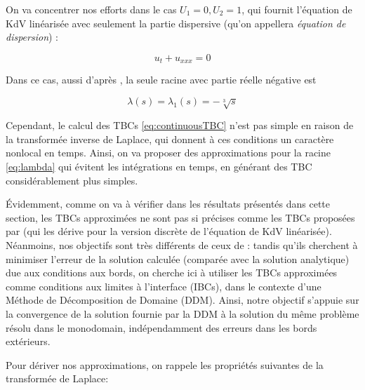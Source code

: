 \indent On va concentrer nos efforts dans le cas $U_1 = 0, U_2 = 1$, qui fournit l'équation de KdV linéarisée avec seulement la partie dispersive (qu'on appellera \emph{équation de dispersion}) :

\begin{equation}
	\label{eq:DKdV}
	u_t + u_{xxx} = 0
\end{equation}

\indent Dans ce cas, aussi d'après \cite{zheng2008}, la seule racine avec partie réelle négative est

\begin{equation}
	\label{eq:lambda}
			\lambda(s) = \lambda_1(s) =  -\sqrt[3]{s} 
\end{equation}

\indent Cependant, le calcul des TBCs \eqref{eq:continuousTBC} n'est pas simple en raison de la transformée inverse de Laplace, qui donnent à ces conditions un caractère nonlocal en temps. Ainsi, on va proposer des approximations pour la racine \eqref{eq:lambda} qui évitent les intégrations en temps, en générant des TBC considérablement plus simples.

\indent Évidemment, comme on va à vérifier dans les résultats présentés dans cette section, les TBCs approximées ne sont pas si précises comme les TBCs proposées par \cite{besse2015} (qui les dérive pour la version discrète de l'équation de KdV linéarisée). Néanmoins, nos objectifs sont très différents de ceux de \cite{besse2015} : tandis qu'ils cherchent à minimiser l'erreur de la solution calculée (comparée avec la solution analytique) due aux conditions aux bords, on cherche ici à utiliser les TBCs approximées comme conditions aux limites à l'interface (IBCs), dans le contexte d'une Méthode de Décomposition de Domaine (DDM). Ainsi, notre objectif s'appuie sur la convergence de la solution fournie par la DDM à la solution du même problème résolu dans le monodomain,  indépendamment des erreurs dans les bords extérieurs. 

\indent Pour dériver nos approximations, on rappele les propriétés suivantes \cite{laplaceTransform} de la transformée de Laplace:

